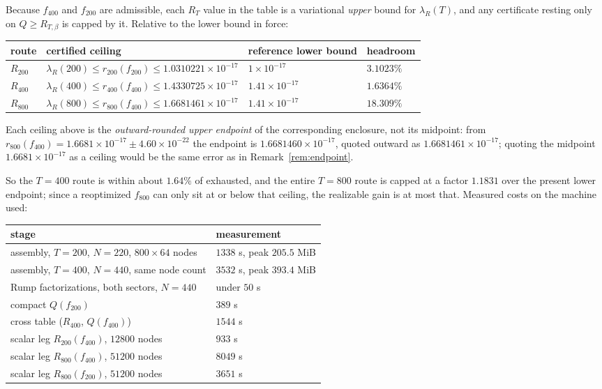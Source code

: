 \documentclass[11pt,a4paper]{article}
\theoremstyle{definition}
\theoremstyle{remark}
\newcommand{\lR}{\lambda_{R}}
\begin{document}
Because $f_{400}$ and $f_{200}$ are admissible, each $R_T$ value in the table is
a variational \emph{upper} bound for $\lR(T)$, and any certificate resting only
on $Q \ge R_{T,\beta}$ is capped by it. Relative to the lower bound in force:
\begin{center}
\begin{tabular}{llll}
\toprule
route & certified ceiling & reference lower bound & headroom \\
\midrule
$R_{200}$ & $\lR(200) \le r_{200}(f_{200}) \le 1.0310221\times10^{-17}$ & $1\times10^{-17}$ & $3.1023\%$ \\
$R_{400}$ & $\lR(400) \le r_{400}(f_{400}) \le 1.4330725\times10^{-17}$ & $1.41\times10^{-17}$ & $1.6364\%$ \\
$R_{800}$ & $\lR(800) \le r_{800}(f_{400}) \le 1.6681461\times10^{-17}$ & $1.41\times10^{-17}$ & $18.309\%$ \\
\bottomrule
\end{tabular}
\end{center}

Each ceiling above is the \emph{outward-rounded upper endpoint} of the
corresponding enclosure, not its midpoint: from
$r_{800}(f_{400}) = 1.6681\times10^{-17} \pm 4.60\times10^{-22}$ the endpoint is
$1.6681460\times10^{-17}$, quoted outward as $1.6681461\times10^{-17}$; quoting
the midpoint $1.6681\times10^{-17}$ as a ceiling would be the same error as in
Remark~\ref{rem:endpoint}.

So the $T = 400$ route is within about $1.64\%$ of exhausted, and the entire
$T = 800$ route is capped at a factor $1.1831$ over the present lower endpoint;
since a reoptimized $f_{800}$ can only sit at or below that ceiling, the
realizable gain is at most that. Measured costs on the machine used:

\begin{center}
\begin{tabular}{ll}
\toprule
stage & measurement \\
\midrule
assembly, $T=200$, $N=220$, $800\times64$ nodes & $1338$ s, peak $205.5$ MiB \\
assembly, $T=400$, $N=440$, same node count    & $3532$ s, peak $393.4$ MiB \\
Rump factorizations, both sectors, $N=440$     & under $50$ s \\
compact $Q(f_{200})$                           & $389$ s \\
cross table ($R_{400}$, $Q(f_{400})$)          & $1544$ s \\
scalar leg $R_{200}(f_{400})$, $12800$ nodes   & $933$ s \\
scalar leg $R_{800}(f_{400})$, $51200$ nodes   & $8049$ s \\
scalar leg $R_{800}(f_{200})$, $51200$ nodes   & $3651$ s \\
\bottomrule
\end{tabular}
\end{center}
\end{document}
